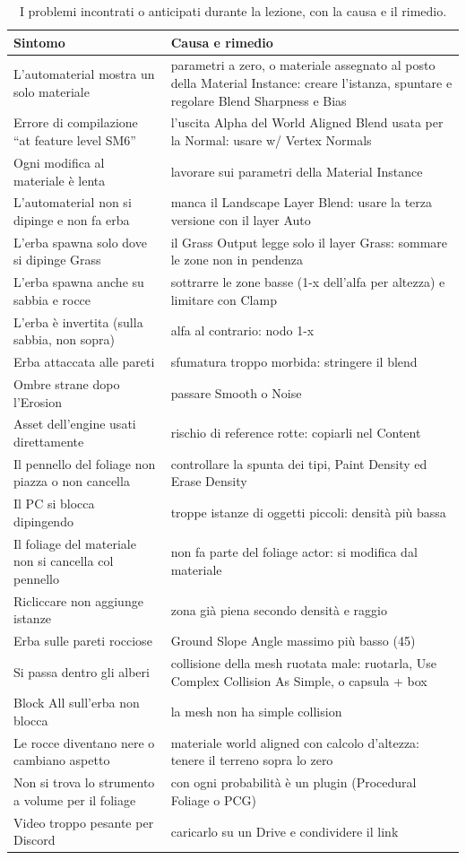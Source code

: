 \begin{table}[htbp]
\centering
\small
\begin{tabular}{@{}p{5.4cm}p{8.6cm}@{}}
\toprule
\textbf{Sintomo} & \textbf{Causa e rimedio} \\
\midrule
L'automaterial mostra un solo materiale & parametri a zero, o materiale assegnato al posto
della Material Instance: creare l'istanza, spuntare e regolare Blend Sharpness e Bias \\
Errore di compilazione ``at feature level SM6'' & l'uscita Alpha del World Aligned Blend
usata per la Normal: usare w/ Vertex Normals \\
Ogni modifica al materiale è lenta & lavorare sui parametri della Material Instance \\
L'automaterial non si dipinge e non fa erba & manca il Landscape Layer Blend: usare la
terza versione con il layer Auto \\
L'erba spawna solo dove si dipinge Grass & il Grass Output legge solo il layer Grass:
sommare le zone non in pendenza \\
L'erba spawna anche su sabbia e rocce & sottrarre le zone basse (1-x dell'alfa per
altezza) e limitare con Clamp \\
L'erba è invertita (sulla sabbia, non sopra) & alfa al contrario: nodo 1-x \\
Erba attaccata alle pareti & sfumatura troppo morbida: stringere il blend \\
Ombre strane dopo l'Erosion & passare Smooth o Noise \\
Asset dell'engine usati direttamente & rischio di reference rotte: copiarli nel Content \\
Il pennello del foliage non piazza o non cancella & controllare la spunta dei tipi, Paint
Density ed Erase Density \\
Il PC si blocca dipingendo & troppe istanze di oggetti piccoli: densità più bassa \\
Il foliage del materiale non si cancella col pennello & non fa parte del foliage actor:
si modifica dal materiale \\
Ricliccare non aggiunge istanze & zona già piena secondo densità e raggio \\
Erba sulle pareti rocciose & Ground Slope Angle massimo più basso (45) \\
Si passa dentro gli alberi & collisione della mesh ruotata male: ruotarla, Use Complex
Collision As Simple, o capsula + box \\
Block All sull'erba non blocca & la mesh non ha simple collision \\
Le rocce diventano nere o cambiano aspetto & materiale world aligned con calcolo
d'altezza: tenere il terreno sopra lo zero \\
Non si trova lo strumento a volume per il foliage & con ogni probabilità è un plugin
(Procedural Foliage o PCG) \\
Video troppo pesante per Discord & caricarlo su un Drive e condividere il link \\
\bottomrule
\end{tabular}
\caption{I problemi incontrati o anticipati durante la lezione, con la causa e il rimedio.}
\label{ue15:tab:errori}
\end{table}

